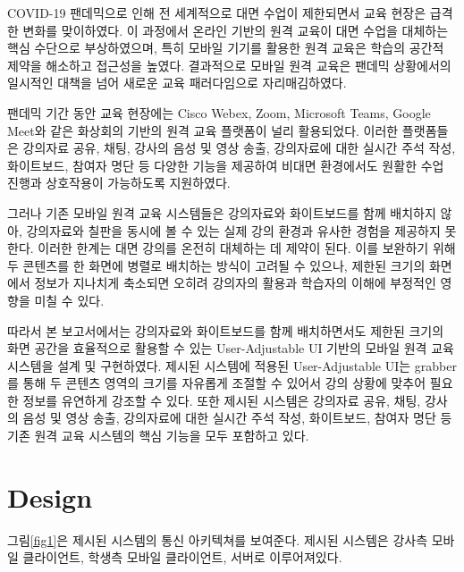 \documentclass[pdflatex,sn-mathphys-num]{sn-jnl}%
\theoremstyle{thmstyleone}%
\theoremstyle{thmstyletwo}%
\theoremstyle{thmstylethree}%
\begin{document}
COVID-19 팬데믹으로 인해 전 세계적으로 대면 수업이 제한되면서 교육 현장은 급격한 변화를 맞이하였다. 이 과정에서 온라인 기반의 원격 교육이 대면 수업을 대체하는 핵심 수단으로 부상하였으며, 특히 모바일 기기를 활용한 원격 교육은 학습의 공간적 제약을 해소하고 접근성을 높였다. 결과적으로 모바일 원격 교육은 팬데믹 상황에서의 일시적인 대책을 넘어 새로운 교육 패러다임으로 자리매김하였다.

팬데믹 기간 동안 교육 현장에는 Cisco Webex\cite{Webex}, Zoom\cite{Zoom}, Microsoft Teams\cite{MicrosoftTeams}, Google Meet\cite{GoogleMeet}와 같은 화상회의 기반의 원격 교육 플랫폼이 널리 활용되었다. 이러한 플랫폼들은 강의자료 공유, 채팅, 강사의 음성 및 영상 송출, 강의자료에 대한 실시간 주석 작성, 화이트보드, 참여자 명단 등 다양한 기능을 제공하여 비대면 환경에서도 원활한 수업 진행과 상호작용이 가능하도록 지원하였다.

그러나 기존 모바일 원격 교육 시스템들은 강의자료와 화이트보드를 함께 배치하지 않아, 강의자료와 칠판을 동시에 볼 수 있는 실제 강의 환경과 유사한 경험을 제공하지 못한다. 이러한 한계는 대면 강의를 온전히 대체하는 데 제약이 된다. 이를 보완하기 위해 두 콘텐츠를 한 화면에 병렬로 배치하는 방식이 고려될 수 있으나, 제한된 크기의 화면에서 정보가 지나치게 축소되면 오히려 강의자의 활용과 학습자의 이해에 부정적인 영향을 미칠 수 있다.

따라서 본 보고서에서는 강의자료와 화이트보드를 함께 배치하면서도 제한된 크기의 화면 공간을 효율적으로 활용할 수 있는 User-Adjustable UI 기반의 모바일 원격 교육 시스템을 설계 및 구현하였다. 제시된 시스템에 적용된 User-Adjustable UI는 grabber를 통해 두 콘텐츠 영역의 크기를 자유롭게 조절할 수 있어서 강의 상황에 맞추어 필요한 정보를 유연하게 강조할 수 있다. 또한 제시된 시스템은 강의자료 공유, 채팅, 강사의 음성 및 영상 송출, 강의자료에 대한 실시간 주석 작성, 화이트보드, 참여자 명단 등 기존 원격 교육 시스템의 핵심 기능을 모두 포함하고 있다.

\section{Design}\label{sec2}

그림\ref{fig1}은 제시된 시스템의 통신 아키텍쳐를 보여준다. 제시된 시스템은 강사측 모바일 클라이언트, 학생측 모바일 클라이언트, 서버로 이루어져있다.
\end{document}
